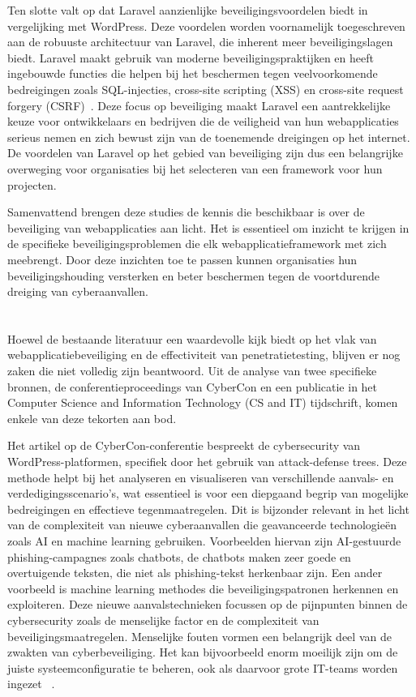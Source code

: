 Ten slotte valt op dat Laravel aanzienlijke beveiligingsvoordelen biedt in vergelijking met WordPress. Deze voordelen worden voornamelijk toegeschreven aan 
de robuuste architectuur van Laravel, die inherent meer beveiligingslagen biedt. Laravel maakt gebruik van moderne beveiligingspraktijken en heeft ingebouwde 
functies die helpen bij het beschermen tegen veelvoorkomende bedreigingen zoals SQL-injecties, cross-site scripting (XSS) en cross-site request forgery (CSRF)~\autocite{Lebedeva2023}. Deze focus 
op beveiliging maakt Laravel een aantrekkelijke keuze voor ontwikkelaars en bedrijven die de veiligheid van hun webapplicaties serieus nemen en zich bewust 
zijn van de toenemende dreigingen op het internet. De voordelen van Laravel op het gebied van beveiliging zijn dus een belangrijke overweging voor organisaties 
bij het selecteren van een framework voor hun projecten.

Samenvattend brengen deze studies de kennis die beschikbaar is over de beveiliging van webapplicaties aan licht. 
Het is essentieel om inzicht te krijgen in de specifieke beveiligingsproblemen die elk webapplicatieframework met zich meebrengt. Door deze inzichten 
toe te passen kunnen organisaties hun beveiligingshouding versterken en beter beschermen tegen de voortdurende dreiging van cyberaanvallen.

\section{}
Hoewel de bestaande literatuur een waardevolle kijk biedt op het vlak van webapplicatiebeveiliging en de effectiviteit van penetratietesting, blijven er nog 
zaken die niet volledig zijn beantwoord. Uit de analyse van twee specifieke bronnen, de conferentieproceedings van CyberCon en een publicatie in het 
Computer Science and Information Technology (CS and IT) tijdschrift, komen enkele van deze tekorten aan bod.

Het artikel op de CyberCon-conferentie bespreekt de cybersecurity van WordPress-platformen, specifiek door het gebruik van attack-defense trees. Deze methode helpt 
bij het analyseren en visualiseren van verschillende aanvals- en verdedigingsscenario's, wat essentieel is voor een diepgaand begrip van mogelijke bedreigingen en 
effectieve tegenmaatregelen. Dit is bijzonder relevant in het licht van de complexiteit van nieuwe cyberaanvallen die geavanceerde technologieën zoals AI en machine 
learning gebruiken. Voorbeelden hiervan zijn AI-gestuurde phishing-campagnes zoals chatbots, de chatbots maken zeer goede en overtuigende teksten, die niet als 
phishing-tekst herkenbaar zijn. Een ander voorbeeld is machine learning methodes die beveiligingspatronen herkennen en exploiteren. Deze nieuwe aanvalstechnieken
focussen op de pijnpunten binnen de cybersecurity zoals de menselijke factor en de complexiteit van beveiligingsmaatregelen. Menselijke fouten vormen een belangrijk 
deel van de zwakten van cyberbeveiliging. Het kan bijvoorbeeld enorm moeilijk zijn om de juiste systeemconfiguratie te beheren, ook als daarvoor grote IT-teams worden 
ingezet ~\autocite{Petrica2022}.

